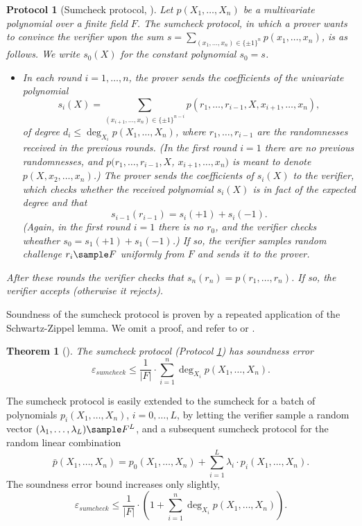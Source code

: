 \documentclass[11pt]{article}
\newtheorem{thm}{Theorem}[]
\newtheorem{protocol}[]{Protocol}
\theoremstyle{definition}
\theoremstyle{definition}
\begin{document}
\begin{protocol}[Sumcheck protocol, \cite{sumcheck}]
\label{p:Sumcheck}
Let $p(X_1,\ldots, X_n)$ be a multivariate polynomial over a finite field $F$. %
The sumcheck protocol, in which a prover wants to convince the verifier upon the sum $s = \sum_{(x_1,\ldots, x_n) \in \{\pm 1\}^n} p(x_1, \ldots, x_n)$, is as follows.
We write $s_0(X)$ for the constant polynomial $s_0 =s$.
\begin{itemize}
\item
In each round $i=1,\ldots, n$, the prover sends the coefficients of the univariate polynomial 
\[
s_i(X) = \sum_{(x_{i+1},\ldots, x_n) \in \{\pm 1\}^{n-i}} p(r_1,\ldots, r_{i-1},X ,x_{i+1}, \ldots, x_n),
\]
of degree $d_i \leq \deg_{X_i} p(X_1,\ldots, X_n)$, where $r_1, \ldots, r_{i-1}$ are the randomnesses received in the previous rounds. (In the first round $i=1$ there are no previous randomnesses, and $p(r_1,\ldots, r_{i-1},X $, $x_{i+1}, \ldots, x_n)$ is meant to denote $p(X,x_2,\ldots, x_n)$.)
The prover sends the coefficients of $s_{i}(X)$ to the verifier, which checks whether the received polynomial $s_i(X)$ is in fact of the expected degree and that
\[
s_{i-1}(r_{i-1}) = s_{i}(+1) + s_{i}(-1).
\] 
(Again, in the first round $i=1$ there is no $r_0$, and the verifier checks wheather $s_0 = s_1(+1) + s_1(-1)$.) 
If so, the verifier samples random challenge $r_i\sample F$ uniformly from $F$ and sends it to the prover.
\end{itemize}
After these rounds the verifier checks that $s_n(r_n) = p(r_1,\ldots, r_n)$. 
If so, the verifier accepts (otherwise it rejects).  
\end{protocol}


Soundness of the sumcheck protocol is proven by a repeated application of the Schwartz-Zippel lemma. 
We omit a proof, and refer to \cite{sumcheck} or \cite{SumcheckThaler}. 
\begin{thm}[\cite{sumcheck}]
The sumcheck protocol (Protocol \ref{p:Sumcheck}) has soundness error
\begin{equation}
\label{e:SumcheckSoundness}
\varepsilon_{sumcheck} \leq \frac{1}{|F|}\cdot \sum_{i=1}^n \deg_{X_i} p(X_1,\ldots, X_n).
\end{equation}
\end{thm}

The sumcheck protocol is easily extended to the sumcheck for a batch of polynomials $p_i(X_1,\ldots, X_n)$, $i=0, \ldots, L$, by letting the verifier sample a random vector $(\lambda_1,\ldots, \lambda_L)\sample F^L$, and a subsequent sumcheck protocol for the random linear combination
\[
\bar p (X_1, \ldots, X_n) = p_0(X_1,\ldots, X_n) + \sum_{i=1}^{L} \lambda_i \cdot p_i(X_1,\ldots, X_n).
\]
The soundness error bound increases only slightly,
\begin{equation}
\label{e:BatchSumcheckSoundness}
\varepsilon_{sumcheck} \leq \frac{1}{|F|}\cdot \left(1 + \sum_{i=1}^n \deg_{X_i} p(X_1,\ldots, X_n)\right).
\end{equation}
\end{document}
